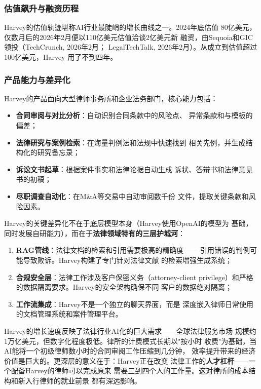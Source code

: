 \subsubsection{估值飙升与融资历程}
Harvey的估值轨迹堪称AI行业最陡峭的增长曲线之一。2024年底估值
80亿美元，仅数月后的2026年2月便以110亿美元估值洽谈2亿美元新
融资，由Sequoia和GIC领投（TechCrunch, 2026年2月；
LegalTechTalk, 2026年2月）。从成立到估值超过100亿美元，Harvey
用了不到四年。

\subsubsection{产品能力与差异化}
Harvey的产品面向大型律师事务所和企业法务部门，核心能力包括：
\begin{itemize}
  \item \textbf{合同审阅与对比分析}：自动识别合同条款中的风险点、
    异常条款和与模板的偏差；
  \item \textbf{法律研究与案例检索}：在海量判例法和法规中快速找到
    相关先例，并生成结构化的研究备忘录；
  \item \textbf{诉讼文书起草}：根据案件事实和法律论据自动生成
    诉状、答辩书和法律意见书的初稿；
  \item \textbf{尽职调查自动化}：在M\&A等交易中自动审阅数千份
    文件，提取关键条款和风险因素。
\end{itemize}

Harvey的关键差异化不在于底层模型本身（Harvey使用OpenAI的模型为
基础，同时发展自研能力），而在于\textbf{法律领域特有的三层护城河}：
\begin{enumerate}
  \item \textbf{RAG管线}：法律文档的检索和引用需要极高的精确度——
    引用错误的判例可能导致败诉。Harvey构建了专门针对法律文献
    的检索增强生成系统；
  \item \textbf{合规安全层}：法律工作涉及客户保密义务（attorney-client
    privilege）和严格的数据隔离要求。Harvey的安全架构确保不同
    客户的数据绝对隔离；
  \item \textbf{工作流集成}：Harvey不是一个独立的聊天界面，而是
    深度嵌入律师日常使用的文档管理系统和案件管理平台。
\end{enumerate}

Harvey的增长速度反映了法律行业AI化的巨大需求——全球法律服务市场
规模约1万亿美元，但数字化程度极低。律所的计费模式长期以"按小时
收费"为基础，当AI能将一个初级律师数小时的合同审阅工作压缩到几分钟，
效率提升带来的经济价值是巨大的。更深层的意义在于：Harvey正在改变
法律工作的\textbf{人才杠杆}——一个配备Harvey的律师可以完成原来
需要三到四个人的工作量。这对律所的成本结构和新入行律师的就业前景
都有深远影响。

